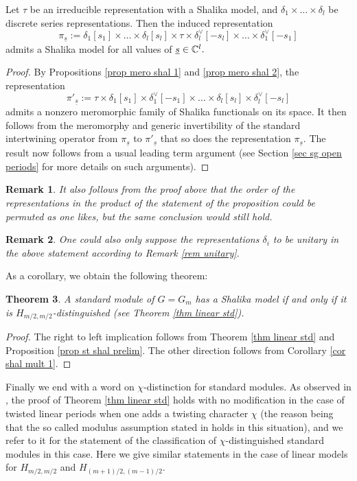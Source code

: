 \documentclass[11pt,letterpaper]{amsart}
\def\d{\delta}
\theoremstyle{plain}
\newtheorem{thm}{Theorem}[section] \newtheorem{cor}[thm]{Corollary}
\newtheorem {rem}[thm]{Remark} \newtheorem{ex}[thm]{Example}
\numberwithin{equation}{section}
\begin{document}
\begin{prop}\label{prop st shal prelim}
Let $\tau$ be an irreducible representation with a Shalika model, and $\d_1 \times \dots \times \d_l$ be discrete series representations. Then the induced representation 
\[\pi_{\underline{s}}:=\d_1[s_1] \times \dots \times \d_l[s_l] \times \tau \times \d_l^\vee[-s_l] \times \dots \times \d_1^\vee[-s_1]\] admits a Shalika model for all values of $\underline{s}\in {\mathbb {C}}^l.$
\end{prop}
\begin{proof}
By Propositions \ref{prop mero shal 1} and \ref{prop mero shal 2}, the representation 
\[\pi'_{\underline{s}}:=\tau \times \d_1[s_1] \times \d_1^\vee[-s_1] \times \dots \times \d_l[s_l] \times \d_l^\vee[-s_l]\] admits a nonzero meromorphic family of 
Shalika functionals on its space. It then follows from the meromorphy and generic invertibility of the standard intertwining operator from $\pi_{\underline{s}}$ to $\pi'_{\underline{s}}$ that so does the representation $\pi_{\underline{s}}$. The result now follows from a usual leading term argument (see Section \ref{sec sg open periods} for more details on such arguments).  
\end{proof}
\begin{rem}
It also follows from the proof above that the order of the representations in the product of the statement of the proposition could be permuted as one likes, but the same conclusion would still hold.
\end{rem}
\begin{rem}
One could also only suppose the representations $\d_i$ to be unitary in the above statement according to Remark \ref{rem unitary}.
\end{rem}

As a corollary, we obtain the following theorem:

\begin{thm}\label{thm class std shal}
A standard module of $G=G_m$ has a Shalika model if and only if it is $H_{m/2,m/2}$-distinguished (see Theorem \ref{thm linear std}).
\end{thm}
\begin{proof}
The right to left implication follows from Theorem \ref{thm linear std} and Proposition \ref{prop st shal prelim}. The other direction follows from Corollary \ref{cor shal mult 1}.
\end{proof}

Finally we end with a word on $\chi$-distinction for standard modules. As observed in \cite[Proposition 3.4]{su24}, the proof of Theorem \ref{thm linear std} holds with no modification in the case of twisted linear periods when one adds a twisting character $\chi$ (the reason being that the so called modulus assumption stated in \cite{MOY} holds in this situation), and we refer to it for the statement of the classification of $\chi$-distinguished standard modules in this case. Here we give similar statements in the case of linear models for 
$H_{m/2,m/2}$ and $H_{(m+1)/2,(m-1)/2}$.
\end{document}
